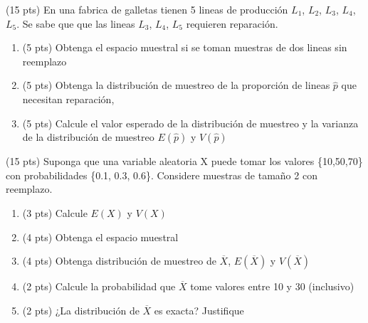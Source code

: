 \documentclass[addpoints]{exam}
\theoremstyle{mytheor}
\begin{document}
\begin{questions}
 \question (15 pts) En una fabrica de galletas tienen 5 lineas de producción $L_1$, $L_2$, $L_3$, $L_4$, $L_5$. Se sabe que que las lineas $L_3$, $L_4$, $L_5$ requieren reparación.

  \begin{enumerate}
  \item (5 pts) Obtenga el espacio muestral si se toman muestras de dos lineas sin reemplazo
  \item (5 pts) Obtenga la distribución de muestreo de la proporción de lineas $\hat{p}$ que necesitan reparación, 
  \item (5 pts) Calcule el valor esperado de la distribución de muestreo y la varianza de la distribución de muestreo $E(\hat{p})$ y $V(\hat{p})$
  \end{enumerate}
  
  
  \question (15 pts) Suponga que una variable aleatoria X puede tomar los valores \{10,50,70\} con probabilidades \{0.1, 0.3, 0.6\}. Considere muestras de tamaño 2 con reemplazo.
  
  \begin{enumerate}
  \item (3 pts) Calcule $E(X)$ y $V(X)$
  \item (4 pts) Obtenga el espacio muestral
  \item (4 pts) Obtenga distribución de muestreo de $\overline{X}$, $E(\overline{X})$ y $V(\overline{X})$
  \item (2 pts) Calcule la probabilidad que $\overline{X}$ tome valores entre 10 y 30 (inclusivo)
  \item (2 pts) ¿La distribución de $\overline{X}$ es exacta? Justifique
  \end{enumerate}

\end{questions}
\end{document}
